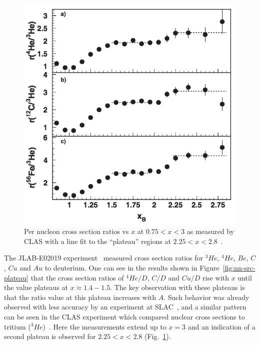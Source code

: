 \begin{figure}[!tbp]
\begin{minipage}[b]{.4\textwidth}
		\includegraphics[height=0.3\textheight]{figures/background/CLAS-nnn-src-ratio.png}
		\caption{Per nucleon cross section ratios vs $x$ at $0.75<x<3$ as measured by CLAS with a line fit to the ``plateau'' regions  at $2.25<x<2.8$~\cite{PhysRevLett.96.082501}.}
		\label{fig:nnn-src-plateau}
	\end{minipage}
\end{figure}

The JLAB-E02019 experiment~\cite{Fomin:2011ng} measured cross section ratios for $^3He$, $^4He$, $Be$, $C$, $Cu$ and $Au$ to deuterium. One can see in the results shown in Figure~\ref{fig:nn-src-plateau} that the cross section ratios of $^4He/D$, $C/D$ and $Cu/D$ rise with $x$ until the value plateaus at $x \approx 1.4 - 1.5$. The key observation with these plateaus is that the ratio value at this plateau increases with $A$. Such behavior was already observed with less accuracy by an experiment at SLAC~\cite{Frankfurt:1993sp}, and a similar pattern can be seen in the CLAS experiment which compared nuclear cross sections to tritium ($^3He$)~\cite{PhysRevLett.96.082501}. Here the measurements extend up to $x=3$ and an indication of a second plateau is observed for $2.25<x<2.8$ (Fig.~\ref{fig:nnn-src-plateau}). 


